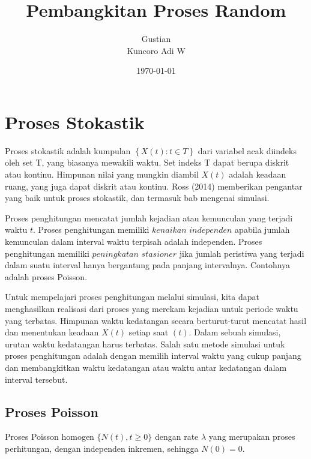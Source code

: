 \documentclass[a4paper,12pt]{article}
\theoremstyle{definition}
\begin{document}
    \title{Pembangkitan Proses Random}
    \author{Gustian\\
            Kuncoro Adi W}
\date{\today}

\begin{titlepage}
    \maketitle
\end{titlepage}


\section{Proses Stokastik} 
Proses stokastik adalah kumpulan $\left \{X\left ( t \right ):t \in T \right \}$ dari variabel acak diindeks oleh set T, yang biasanya mewakili waktu. Set indeks T dapat berupa diskrit atau kontinu. Himpunan nilai yang mungkin diambil $X\left ( t \right )$ adalah keadaan ruang, yang juga dapat diskrit atau kontinu. Ross (2014) memberikan pengantar yang baik untuk proses stokastik, dan termasuk bab mengenai simulasi.

Proses penghitungan mencatat jumlah kejadian atau kemunculan yang terjadi waktu $\textit{t}$. Proses penghitungan memiliki $\textit{kenaikan independen}$ apabila jumlah kemunculan dalam interval waktu terpisah adalah independen. Proses penghitungan memiliki $\textit{peningkatan stasioner}$ jika jumlah peristiwa yang terjadi dalam suatu interval hanya bergantung pada panjang intervalnya. Contohnya adalah proses Poisson.

Untuk mempelajari proses penghitungan melalui simulasi, kita dapat menghasilkan realisasi dari proses yang merekam kejadian untuk periode waktu yang terbatas. Himpunan waktu kedatangan secara berturut-turut mencatat hasil dan menentukan keadaan $X\left ( t \right )$ setiap saat $\left ( t \right )$. Dalam sebuah simulasi, urutan waktu kedatangan harus terbatas. Salah satu metode simulasi untuk proses penghitungan adalah dengan memilih interval waktu yang cukup panjang dan membangkitkan waktu kedatangan atau waktu antar kedatangan dalam interval tersebut.

\subsection{Proses Poisson} 
Proses Poisson homogen $\{N(t), t \geq 0\}$ dengan rate $\lambda$ yang merupakan proses perhitungan, dengan independen inkremen, sehingga $N(0) = 0$.
\end{document}
